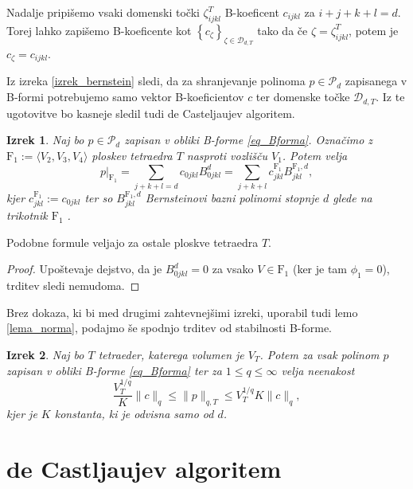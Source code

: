 \documentclass[11pt,a4paper]{article}
\newtheorem{theorem}{Izrek}
\begin{document}
Nadalje pripišemo vsaki domenski točki $\zeta_{ijkl}^T$ B-koeficent
$c_{ijkl}$ za $i +j+k+l = d$. Torej lahko zapišemo B-koeficente kot $\left\{
    c_{\zeta}
\right\}_{\zeta \in \mathcal{D}_{d,T}}$ tako da če $\zeta = \zeta_{ijkl}^T$,
potem je $c_{\zeta} = c_{ijkl}$.

Iz izreka \ref{izrek_bernstein} sledi, da za shranjevanje polinoma $p \in \mathcal{P}_d$ zapisanega v B-formi potrebujemo samo vektor B-koeficientov $c$ ter domenske točke $\mathcal{D}_{d,T}$. Iz te ugotovitve bo kasneje sledil tudi de Casteljaujev algoritem.

\begin{theorem}
    Naj bo $p \in \mathcal{P}_d$ zapisan v obliki B-forme \eqref{eq_Bforma}. Označimo 
    z $\text{F}_1 := \langle V_2,V_3,V_4 \rangle$ ploskev tetraedra $T$ nasproti vozlišču $V_1$.
    Potem velja 
    \begin{equation*}
        p|_{\text{F}_1} = \sum_{j+k+l = d} c_{0jkl}B_{0jkl}^d = 
            \sum_{j+k+l}c_{jkl}^{\text{F}_1} B_{jkl}^{\text{F}_1,d},
    \end{equation*}
    kjer $c_{jkl}^{\text{F}_1}:=c_{0jkl}$ ter so $B_{jkl}^{\text{F}_1,d}$
    Bernsteinovi bazni polinomi stopnje $d$ glede na trikotnik $\text{F}_1$ .
\end{theorem}

Podobne formule veljajo za ostale ploskve tetraedra $T$.

\begin{proof}
    Upoštevaje dejstvo, da je $B_{0jkl}^d = 0$ za vsako $V \in \text{F}_1$ (ker je 
    tam $\phi_1 = 0$), trditev sledi nemudoma.
\end{proof}

Brez dokaza, ki bi med drugimi zahtevnejšimi izreki, uporabil 
tudi lemo \ref{lema_norma},
podajmo še spodnjo trditev od stabilnosti B-forme.
\begin{theorem}
    Naj bo $T$ tetraeder, katerega volumen je $V_T$. Potem za vsak
    polinom $p$ zapisan v obliki B-forme \eqref{eq_Bforma} ter za $1 \leq q \leq \infty$
    velja neenakost
    \[
    \frac{V_T^{1/q}}{K} \| c \|_q \leq \| p \|_{q,T} \leq V_T^{1/q} K \| c \|_q,
    \]
    kjer je $K$ konstanta, ki je odvisna samo od $d$.
\end{theorem}

\section{de Castljaujev algoritem}
\end{document}
